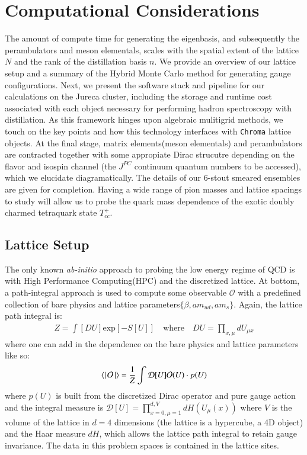 \chapter{Computational Considerations}
\label{sec:comp}
The amount of compute time for generating the eigenbasis, and subsequently the perambulators and meson elementals, scales with the spatial extent of the lattice $N$ and the rank of the distillation basis $n$. We provide an overview of our lattice setup and a summary of the Hybrid Monte Carlo method for generating gauge configurations. Next, we present the software stack and pipeline for our calculations on the Jureca cluster, including the storage and runtime cost associated with each object necessary for performing hadron spectroscopy with distillation. As this framework hinges upon algebraic mulitigrid methods, we touch on the key points and how this technology interfaces with \texttt{Chroma} lattice objects. At the final stage, matrix elements(meson elementals) and perambulators are contracted together with some appropiate Dirac strucutre depending on the flavor and isospin channel (the $J^{PC}$ continuum quantum numbers to be accessed), which we elucidate diagramatically. The details of our 6-stout smeared ensembles are given for completion. Having a wide range of pion masses and lattice spacings to study will allow us to probe the quark mass dependence of the exotic doubly charmed tetraquark state $T_{cc}^+$.   

\section{Lattice Setup}
The only known \textit{ab-initio} approach to probing the low energy regime of QCD is with High Performance Computing(HPC) and the discretized lattice. At bottom, a path-integral approach is used to compute some observable $\mathcal{O}$ with a predefined collection of bare physics and lattice parameters$\{\beta,am_{ud},am_s\}$. Again, the lattice path integral is:
\begin{align}
  Z = \int [DU] \text{exp}\left[-S[U]\right] \quad \text{where} \quad  DU = \prod_{x,\mu}^{} dU_{\mu x}
\end{align} where one can add in the dependence on the bare physics and lattice parameters like so: 
\begin{equation}
  \bra{}\mathcal{O}\ket{} = \frac{1}{Z} \int \mathcal{D}[U] \mathcal{O}(U) \cdot p(U)
\end{equation} where $p(U)$ is built from the discretized Dirac operator and pure gauge action and the integral measure is $\mathcal{D}[U] = \prod_{x=0,\mu=1}^{d,V} dH(U_\mu(x))$ where $V$ is the volume of the lattice in $d=4$ dimensions (the lattice is a hypercube, a 4D object) and the Haar measure $dH$, which allows the lattice path integral to retain gauge invariance. The data in this problem spaces is contained in the lattice sites. 

